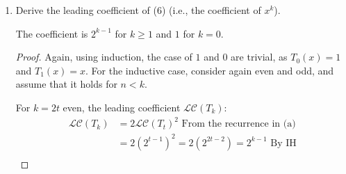 \documentclass{article}
\begin{document}
\begin{enumerate}
\begin{enumerate}
\begin{proof}
                    First $k = 2t$ is even
                    \begin{align*}
                        \cos(k\arccos(x)) &= \cos(2(t\arccos(x)))  \\
                        &= 2(\cos(t\arccos(x)))^2 - 1 \text{ [Double angle identity]}\\
                        &= 2(T_t(x))^2 - 1 
                    \end{align*}
                    This is again a polynomial since $T_t$ is one by IH, so this case holds.

                    Second $k = 2t + 1$ is odd
                    \begin{align*}
                        \cos(k\arccos(x)) &= \cos(2(t\arccos(x)) + \arccos(x)) \\
                        &\overset{\text{angle sum}}{=} \cos(2t\arccos(x))(\cos(\arccos(x))) - \sin(2t\arccos(x))(\sin(\arccos(x))) \\
                        &= xT_{2t}(x)- \sin(2t\arccos(x))(\sin(\arccos(x))) \\
                        &\overset{\text{double angle}}{=} xT_{2k}(x)- 2\cos(t\arccos(x))\sin(t\arccos(x))(\sin(\arccos(x))) \\
                        &= xT_{2t}(x)- 2T_t(x)\sin(t\arccos(x))(\sin(\arccos(x))) \\
                        &\overset{\text{angle prod}}{=} xT_{2k}(x)- T_t(x)(\cos((t-1)\arccos(x))-\cos((t+1)\arccos(x)))\\
                        &= xT_{2t}(x)- T_t(x)(T_{t-1}-T_{t+1})\\
                    \end{align*}
                    Which is again a polynomial all the lower degrees of $T$ are polynomials by IH, so both cases hold.
                \end{proof}
            \item Derive the leading coefficient of (6) (i.e., the coefficient of $x^k$).

                The coefficient is $2^{k-1}$ for $k \geq 1$ and $1$ for $k=0$.
                \begin{proof}
                    Again, using induction, the case of $1$ and $0$ are trivial, as $T_0(x) = 1$ and $T_1(x) = x$. For the inductive case, consider again even and odd, and assume that it holds for $n < k$.

                    For $k = 2t$ even, the leading coefficient $\mathcal L \mathcal C (T_k)$:
                    \begin{align*}
                        \mathcal L \mathcal C (T_k) &= 2 \mathcal L \mathcal C (T_t)^2 \text{ From the recurrence in (a)} \\
                        &= 2  (2^{t-1})^2 = 2 (2^{2t-2}) = 2^{k-1} \text{ By IH}\\
                    \end{align*}


\end{proof}
\end{enumerate}
\end{enumerate}
\end{document}
